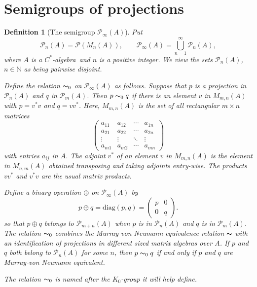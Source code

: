 \documentclass{book}
\newtheorem{definition}{Definition}[section]
\def\cstar{\(C^*\)-algebra}
\begin{document}
\section{Semigroups of projections}
\begin{definition}[The semigroup \(\mathcal{P}_\infty(A)\)]\label{def:PinftyA}
  Put 
  \[
    \mathcal{P}_n(A)=\mathcal{P}(M_n(A)),\qquad\mathcal{P}_\infty(A)=\bigcup_{n=1}^{\infty}\mathcal{P}_n(A),
  \]
  where \(A\) is a \cstar\ and \(n\) is a positive integer. We view the sets \(\mathcal{P}_n(A)\), \(n\in\mathbb{N}\) as being pairwise disjoint.\par
  Define the relation \(\thicksim_0\) on \(\mathcal{P}_\infty(A)\) as follows. Suppose that \(p\) is a projection in \(\mathcal{P}_n(A)\) and \(q\) in \(\mathcal{P}_m(A)\).
  Then \(p\thicksim_0 q\) if there is an element \(v\) in \(M_{m,n}(A)\) with \(p=v^*v\) and \(q=vv^*\). Here, \(M_{m,n}(A)\) is the set of all rectangular \(m\times n\) matrices
  \[
    \begin{pmatrix}
      a_{11}&a_{12}&\cdots&a_{1n}\\
      a_{21}&a_{22}&\cdots&a_{2n}\\
      \vdots&\vdots&\ddots&\vdots\\
      a_{m1}&a_{m2}&\cdots&a_{mn}
    \end{pmatrix}
  \]
  with entries \(a_{ij}\) in \(A\). The adjoint \(v^*\) of an element \(v\) in \(M_{m,n}(A)\) is the element in 
  \(M_{n,m}(A)\) obtained transposing and taking adjoints entry-wise.
  The products \(vv^*\) and \(v^*v\) are the usual matrix products.\par
  Define a binary operation \(\oplus\) on \(\mathcal{P}_\infty(A)\) by
  \[
    p\oplus q=\text{diag}(p,q)=\begin{pmatrix}
      p&0\\0&q
    \end{pmatrix}.
  \]
  so that \(p\oplus q\) belongs to \(\mathcal{P}_{m+n}(A)\) when \(p\) is in \(\mathcal{P}_n(A)\) and \(q\) is in \(\mathcal{P}_m(A)\).\\
  The relation \(\thicksim_0\) combines the Murray-von Neumann equivalence relation \(\thicksim\) with an identification
  of projections in different sized matrix algebras over \(A\). If \(p\) and \(q\) both belong to \(\mathcal{P}_n(A)\) for some \(n\), then
  \(p\thicksim_0 q\) if and only if \(p\) and \(q\) are Murray-von Neumann equivalent.\par
  The relation \(\thicksim_0\) is named after the \(K_0\)-group it will help define.
\end{definition}
\end{document}

